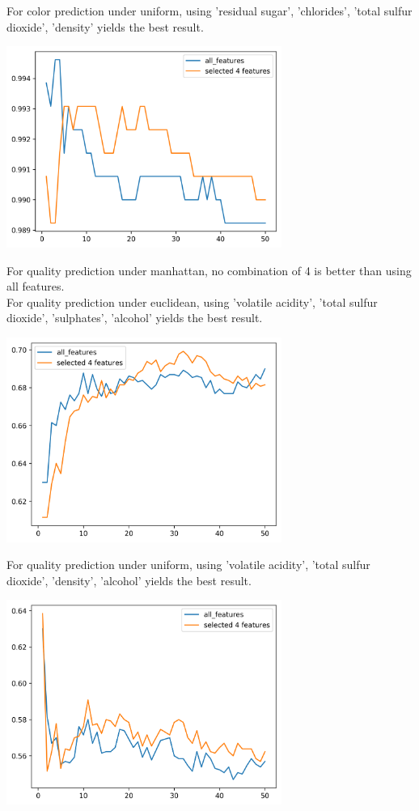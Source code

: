 \documentclass[12pt]{article}
\begin{document}
\noindent
For color prediction under uniform, using 'residual sugar', 'chlorides', 'total sulfur dioxide', 'density' yields the best result.
\begin{center}
    \includegraphics[width=9cm]{../select4features/color_u.png}
\end{center}
\noindent
For quality prediction under manhattan, no combination of 4 is better than using all features.\\
For quality prediction under euclidean, using 'volatile acidity', 'total sulfur dioxide', 'sulphates', 'alcohol' yields the best result.
\begin{center}
    \includegraphics[width=9cm]{../select4features/quality_e.png}
\end{center}
\noindent
For quality prediction under uniform, using 'volatile acidity', 'total sulfur dioxide', 'density', 'alcohol' yields the best result.
\begin{center}
    \includegraphics[width=9cm]{../select4features/quality_u.png}
\end{center}
\end{document}
